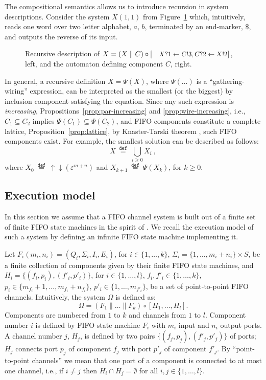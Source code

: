 \documentclass{llncs}
\newcommand{\udarrow}{{\uparrow\downarrow}}
\newcommand{\out}[1]{}
\newcommand{\df}[1]{\ \stackrel{\mathtt{def}}{#1}\ }
\begin{document}
The compositional semantics allows us to introduce recursion in system
descriptions. Consider the system $X(1,1)$ from
Figure~\ref{fig:reverse} which, intuitively, reads one word over two
letter alphabet, $a$, $b$, terminated by an end-marker, $\$$, and
outputs the reverse of its input.

\begin{figure}[htb]
  \centering
  
  \caption{Recursive description of $X= (X\parallel C)\circ
    [\mbox{\footnotesize $X?1\leftarrow C!3, C?2\leftarrow X!2$}]$,
    left, and the automaton defining component $C$, right.}
  \label{fig:reverse}
\end{figure}

In general, a recursive definition $X=\Psi(X)$, where $\Psi(\ldots)$
is a ``gathering-wiring'' expression, can be interpreted as the
smallest (or the biggest) by inclusion component satisfying the
equation. Since any such expression is \emph{increasing},
Propositions~\ref{prop:par-increasing} and \ref{prop:wire-increasing},
i.e., $C_1\subseteq C_2$ implies $\Psi(C_1)\subseteq \Psi(C_2)$, and
FIFO components constitute a complete lattice,
Proposition~\ref{prop:lattice}, by Knaster-Tarski theorem
\cite{tarski-55}, such FIFO components exist. For example, the
smallest solution can be described as follows:
\[ X\df{=} \bigcup_{i\geq 0} X_i ~,
\] 
where $X_0\df{=}\udarrow(\varepsilon^{m+n})$ and
$X_{k+1}\df{=}\Psi(X_k)$, for $k\geq 0$.


\subsection{Execution model}

In this section we assume that a FIFO channel system is built out of a
finite set of finite FIFO state machines in the spirit of
\cite{bz-83}. We recall the execution model of such a system by
defining an infinite FIFO state machine implementing it.  

\out{Then we show that the semantics of the system in terms of word
  relations coincides with this execution model.}

Let $F_i(m_i,n_i)=(Q_i,\Sigma_i,I_i,E_i)$, for $i\in\{1,\ldots,k\}$,
$\Sigma_i=\{1,\ldots,m_i+n_i\}\times S$, be a finite collection of
components given by their finite FIFO state machines, and
$H_i=\{(f_i,p_i),(f'_i,p'_i)\}$, for $i\in\{1,\ldots,l\}$,
$f_i,f'_i\in \{1,\ldots,k\}$,
$p_i\in\{m_{f_i}+1,\ldots,m_{f_i}+n_{f_i}\}$, $p'_i\in
\{1,\ldots,m_{f'_i}\}$, be a set of point-to-point FIFO
channels. Intuitively, the system $\Omega$ is defined as:
\[
 \Omega = (F_1\parallel \ldots \parallel F_k)\circ [H_1,\ldots, H_l].
\]
Components are numbered from $1$ to $k$ and channels from $1$ to
$l$. Component number $i$ is defined by FIFO state machine $F_i$ with
$m_i$ input and $n_i$ output ports. A channel number $j$, $H_j$, is defined by
two pairs $\{(f_j,p_j),(f'_j,p'_j)\}$ of ports; $H_j$ connects
port $p_j$ of component $f_j$ with port $p'_j$ of component $f'_j$. By
``point-to-point channels'' we mean that one port of a component is
connected to at most one channel, i.e., if $i\neq j$ then $H_i\cap
H_j=\emptyset$ for all $i,j\in\{1,\ldots,l\}$.
\end{document}
